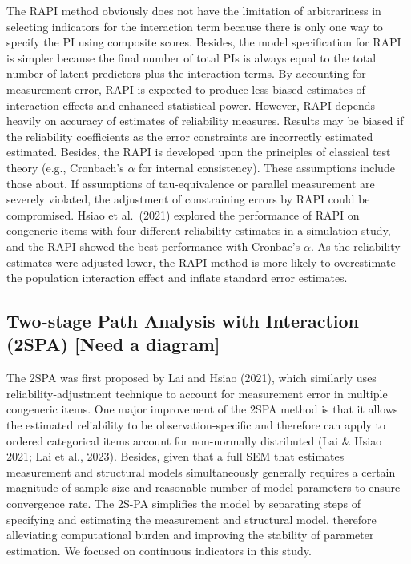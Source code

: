 \documentclass[
  man]{apa7}
\begin{document}
The RAPI method obviously does not have the limitation of arbitrariness in selecting indicators for the interaction term because there is only one way to specify the PI using composite scores. Besides, the model specification for RAPI is simpler because the final number of total PIs is always equal to the total number of latent predictors plus the interaction terms. By accounting for measurement error, RAPI is expected to produce less biased estimates of interaction effects and enhanced statistical power. However, RAPI depends heavily on accuracy of estimates of reliability measures. Results may be biased if the reliability coefficients as the error constraints are incorrectly estimated estimated. Besides, the RAPI is developed upon the principles of classical test theory (e.g., Cronbach's \(\alpha\) for internal consistency). These assumptions include those about. If assumptions of tau-equivalence or parallel measurement are severely violated, the adjustment of constraining errors by RAPI could be compromised. Hsiao et al.~(2021) explored the performance of RAPI on congeneric items with four different reliability estimates in a simulation study, and the RAPI showed the best performance with Cronbac's \(\alpha\). As the reliability estimates were adjusted lower, the RAPI method is more likely to overestimate the population interaction effect and inflate standard error estimates.

\hypertarget{two-stage-path-analysis-with-interaction-2spa-need-a-diagram}{%
\subsection{Two-stage Path Analysis with Interaction (2SPA) {[}Need a diagram{]}}\label{two-stage-path-analysis-with-interaction-2spa-need-a-diagram}}

The 2SPA was first proposed by Lai and Hsiao (2021), which similarly uses reliability-adjustment technique to account for measurement error in multiple congeneric items. One major improvement of the 2SPA method is that it allows the estimated reliability to be observation-specific and therefore can apply to ordered categorical items account for non-normally distributed (Lai \(\&\) Hsiao 2021; Lai et al., 2023). Besides, given that a full SEM that estimates measurement and structural models simultaneously generally requires a certain magnitude of sample size and reasonable number of model parameters to ensure convergence rate. The 2S-PA simplifies the model by separating steps of specifying and estimating the measurement and structural model, therefore alleviating computational burden and improving the stability of parameter estimation. We focused on continuous indicators in this study.
\end{document}
